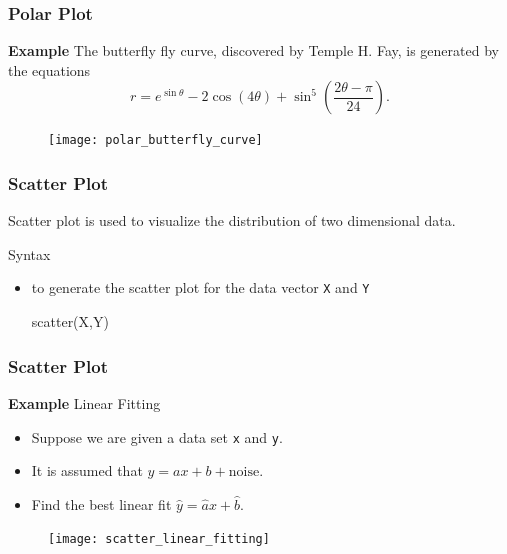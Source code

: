 \documentclass{beamer}  %
\begin{document}
\begin{frame}[fragile]
\frametitle{Polar Plot}
\textbf{Example} 
The butterfly fly curve, discovered by Temple H. Fay, is generated by the equations
\begin{equation}
r=e^{\sin \theta} - 2 \cos (4 \theta ) + \sin^5\left(\frac{2 \theta - \pi}{24}\right).
\end{equation}\pause

\setcounter{subfigure}{0}
\begin{figure}
    \centering
   \texttt{[image: polar\_butterfly\_curve]}
\end{figure}

\end{frame}
\begin{frame}[fragile]
\frametitle{Scatter Plot}
Scatter plot is used to visualize the distribution of two dimensional data.

\begin{block}{Syntax}
\begin{itemize}
    \item to generate the scatter plot for the data vector \texttt{X} and \texttt{Y}
          \begin{matlabcodebeamer}[numbers=none,frame=none,backgroundcolor=\color{blockbody}]
          scatter(X,Y)
          \end{matlabcodebeamer}
\end{itemize}
\end{block}


\end{frame}
\begin{frame}[fragile]
\frametitle{Scatter Plot}
\textbf{Example} Linear Fitting

\begin{itemize}[<+->]
    \item Suppose we are given a data set \texttt{x} and \texttt{y}.
    \item It is assumed that $y = ax + b + \mbox{noise}$.
    \item Find the best linear fit $\hat{y} = \hat{a} x + \hat{b}$.
\end{itemize}
\pause
\setcounter{subfigure}{0}
\begin{figure}
    \centering
   \texttt{[image: scatter\_linear\_fitting]}
\end{figure}

\end{frame}
\end{document}
